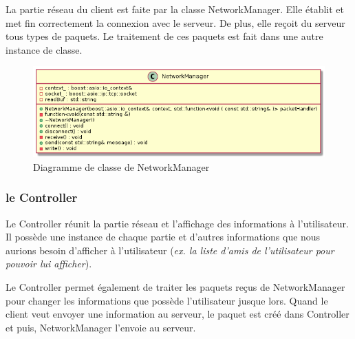 \documentclass{article}
\begin{document}
La partie réseau du client est faite par la classe NetworkManager. Elle établit et met fin correctement la connexion avec le serveur. De plus, elle reçoit du serveur tous types de paquets. Le traitement de ces paquets est fait dans une autre instance de classe.

\begin{figure}[!ht]
	\centering
	 \includegraphics[scale=0.5]{../res/uml/class/NetworkManagerClass.png}
	 \caption{Diagramme de classe de NetworkManager}
	 \label{fig:NetworkManagerDiagram}
\end{figure}

\subsubsection{le Controller}

Le Controller réunit la partie réseau et l'affichage des informations à l'utilisateur. Il possède une instance de chaque partie et d'autres informations que nous aurions besoin d'afficher à l'utilisateur (\textit{ex. la liste d'amis de l'utilisateur pour pouvoir lui afficher}). 

Le Controller permet également de traiter les paquets reçus de NetworkManager pour changer les informations que possède l'utilisateur jusque lors. Quand le client veut envoyer une information au serveur, le paquet est créé dans Controller et puis, NetworkManager l'envoie au serveur.
\end{document}
